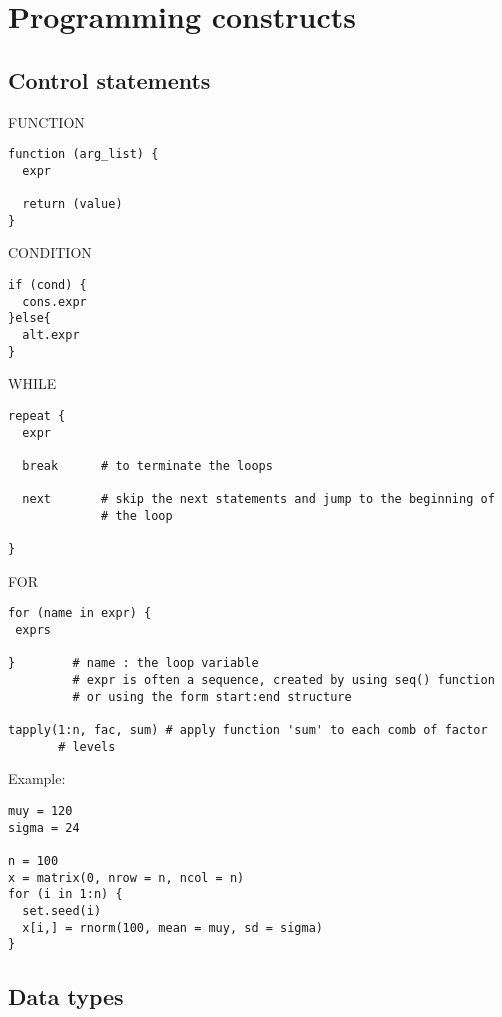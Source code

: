 
\chapter{Programming constructs}
\label{chap:progr-constr}


\section{Control statements}
\label{sec:control-statements}

FUNCTION
\begin{lstlisting}
function (arg_list) {
  expr

  return (value)
}
\end{lstlisting}


CONDITION
\begin{lstlisting}
if (cond) {
  cons.expr
}else{
  alt.expr
}
\end{lstlisting}

WHILE
\begin{lstlisting}
repeat {
  expr

  break      # to terminate the loops

  next       # skip the next statements and jump to the beginning of
             # the loop

}
\end{lstlisting}


FOR
\begin{lstlisting}
for (name in expr) {
 exprs

}        # name : the loop variable
         # expr is often a sequence, created by using seq() function
         # or using the form start:end structure

tapply(1:n, fac, sum) # apply function 'sum' to each comb of factor
       # levels 

\end{lstlisting}

Example:
\begin{lstlisting}
muy = 120
sigma = 24

n = 100
x = matrix(0, nrow = n, ncol = n)
for (i in 1:n) {
  set.seed(i)
  x[i,] = rnorm(100, mean = muy, sd = sigma)
}
\end{lstlisting}


\section{Data types}
\label{sec:data-types}



